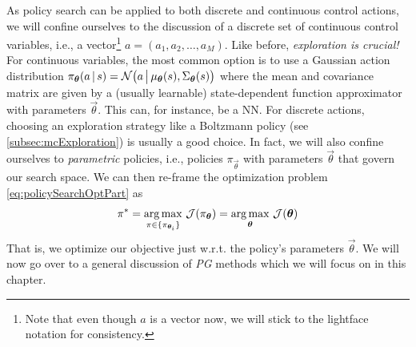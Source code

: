 	As policy search can be applied to both discrete and continuous control actions, we will confine ourselves to the discussion of a discrete set of continuous control variables, i.e., a vector\footnote{Note that even though \(a\) is a vector now, we will stick to the lightface notation for consistency.} \( a = (a_1, a_2, \dots, a_M) \). Like before, \emph{exploration is crucial!} For continuous variables, the most common option is to use a Gaussian action distribution \( \pi_{\bm{\theta}}(a \,\vert\, s) = \mathcal{N}\bigl( a \,\big\vert\, \mu_{\bm{\theta}}(s), \Sigma_{\bm{\theta}}(s) \bigr) \) where the mean and covariance matrix are given by a (usually learnable) state-dependent function approximator with parameters \(\vec{\theta}\). This can, for instance, be a \ac{NN}. For discrete actions, choosing an exploration strategy like a Boltzmann policy (see \autoref{subsec:mcExploration}) is usually a good choice. In fact, we will also confine ourselves to \emph{parametric} policies, i.e., policies \(\pi_{\vec{\theta}}\) with parameters \(\vec{\theta}\) that govern our search space. We can then re-frame the optimization problem \eqref{eq:policySearchOptPart} as
	\begin{equation}
		\pi^\ast
			= \operatorname*{arg\,max}_{\pi \in \{ \pi_{\bm{\theta}_i} \}} \, \mathcal{J}(\pi_{\bm{\theta}})
			= \operatorname*{arg\,max}_{\bm{\theta}} \, \mathcal{J}(\bm{\theta})
	\end{equation}
	That is, we optimize our objective just w.r.t. the policy's parameters \(\vec{\theta}\). We will now go over to a general discussion of \emph{\acl{PG}} methods which we will focus on in this chapter.


